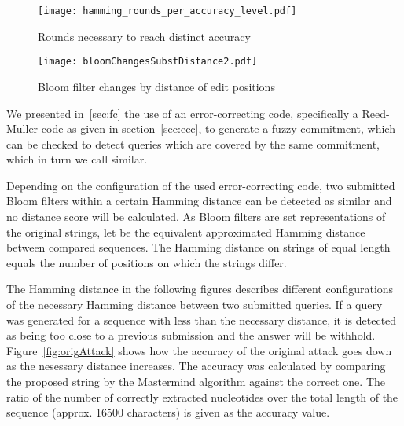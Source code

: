 \documentclass{llncs}
\begin{document}
\begin{figure*}
        \centering
        \begin{minipage}[b]{0.45\textwidth}
                \centering
                \texttt{[image: hamming\_rounds\_per\_accuracy\_level.pdf]}
                \caption{Rounds necessary to reach distinct accuracy}
                \label{fig:accuracyPlateus}
        \end{minipage}\hspace{12pt} \begin{minipage}[b]{0.45\textwidth}
                \centering
                \texttt{[image: bloomChangesSubstDistance2.pdf]}
                \caption{Bloom filter changes by distance of edit positions}
                \label{fig:bloomDistance}
        \end{minipage}
\end{figure*}

We presented in~\ref{sec:fc} the use of an error-correcting code, specifically
a Reed-Muller code as given in section~\ref{sec:ecc}, to generate a fuzzy commitment, which can be
checked to detect queries which are covered by the same commitment, which in
turn we call similar.

Depending on the configuration of the used error-correcting code, two submitted Bloom filters within a certain
Hamming distance  can be detected as similar and no distance score will be calculated.
As Bloom filters are set representations of the original strings, let  be the equivalent
approximated Hamming distance between compared sequences. The Hamming distance on strings of
equal length equals the number of positions on which the strings differ.

The Hamming distance in the following figures describes different configurations of the necessary Hamming distance  between two submitted queries.
If a query was generated for a sequence with less than the necessary distance, it is detected as being too close to a previous submission and the answer will be withhold.
Figure~\ref{fig:origAttack} shows how the accuracy of the original attack goes down as the nesessary distance  increases.
The accuracy was calculated by comparing the proposed string by the Mastermind algorithm against the correct one.
The ratio of the number of correctly extracted nucleotides over the total length of the sequence (approx. 16500 characters) is given as the accuracy value.
\end{document}
